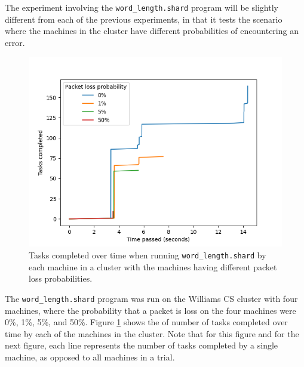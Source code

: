\documentclass[oneside]{report}
\begin{document}
The experiment involving the \texttt{word\_length.shard} program will be slightly different from each of the previous experiments, in that it tests the scenario where the machines in the cluster have different probabilities of encountering an error.


\begin{figure}[h]
  \begin{center}
    \includegraphics[scale=0.9]{img/experiments/e10_1620960581241.png}
    \caption{Tasks completed over time when running \texttt{word\_length.shard} by each machine in a cluster with the machines having different packet loss probabilities.}
    \label{fig:packetlosswordlength}
  \end{center}
\end{figure}

The \texttt{word\_length.shard} program was run on the Williams CS cluster with four machines, where the probability that a packet is loss on the four machines were 0\%, 1\%, 5\%, and 50\%.
Figure \ref{fig:packetlosswordlength} shows the of number of tasks completed over time by each of the machines in the cluster.
Note that for this figure and for the next figure, each line represents the number of tasks completed by a single machine, as opposed to all machines in a trial.
\end{document}
